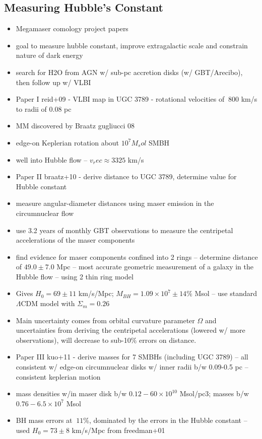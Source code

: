 \subsection{Measuring Hubble's Constant}
\label{sub:h2o_cosmo}

\begin{itemize}
\item Megamaser comology project papers
\item goal to measure hubble constant, improve extragalactic scale and constrain nature of dark energy
\item search for H2O from AGN w/ sub-pc accretion disks (w/ GBT/Arecibo), then follow up w/ VLBI
\item Paper I  reid+09 - VLBI map in UGC 3789 - rotational velocities of $~800$ km/s to radii of 0.08 pc
\item MM discovered by Braatz gugliucci 08
\item edge-on Keplerian rotation about $10^7 M_sol$ SMBH
\item well into Hubble flow -- $v_rec\approx3325$ km/s
\item Paper II braatz+10 - derive distance to UGC 3789, determine value for Hubble constant
\item measure angular-diameter distances using maser emission in the circumnuclear flow
\item use 3.2 years of monthly GBT observations to measure the centripetal accelerations of the maser components
\item find evidence for maser components confined into 2 rings -- determine distance of $49.0\pm7.0$ Mpc -- most accurate geometric measurement of a galaxy in the Hubble flow -- using 2 thin ring model
\item Gives $H_0=69\pm11$ km/s/Mpc; $M_{BH}=1.09\times10^7 \pm 14\% $ Msol -- use standard $\Lambda$CDM model with $\Sigma_m=0.26$
\item Main uncertainty comes from orbital curvature parameter $\Omega$ and uncertainties from deriving the centripetal accelerations (lowered w/ more observations), will decrease to sub-10\% errors on distance.
\item Paper III kuo+11 - derive masses for 7 SMBHs (including UGC 3789) -- all consistent w/ edge-on circumnuclear disks w/ inner radii b/w 0.09-0.5 pc -- consistent keplerian motion
\item mass densities w/in maser disk b/w $0.12-60\times10^{10}$ Msol/pc3; masses b/w $0.76-6.5\times10^7$ Msol
\item BH mass errors at $~11$\%, dominated by the errors in the Hubble constant -- used $H_0=73\pm8$ km/s/Mpc from freedman+01

\end{itemize}
